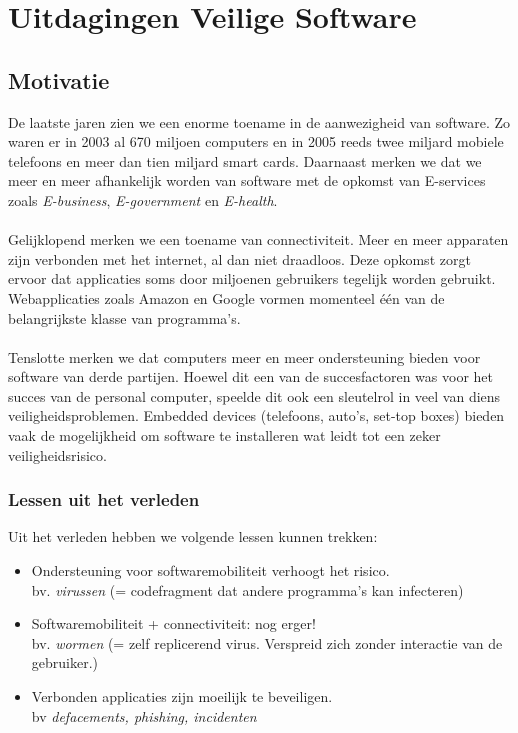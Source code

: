 \documentclass[../main.tex]{subfiles}
\begin{document}
\chapter{Uitdagingen Veilige Software}

\section{Motivatie}
De laatste jaren zien we een enorme toename in de aanwezigheid van software. Zo waren er in 2003 al 670 miljoen computers en in 2005 reeds twee miljard mobiele telefoons en meer dan tien miljard smart cards. Daarnaast merken we dat we meer en meer afhankelijk worden van software met de opkomst van E-services zoals \textit{E-business}, \textit{E-government} en \textit{E-health}. 
\\\\
Gelijklopend merken we een toename van connectiviteit. Meer en meer apparaten zijn verbonden met het internet, al dan niet draadloos. Deze opkomst zorgt ervoor dat applicaties soms door miljoenen gebruikers tegelijk worden gebruikt. Webapplicaties zoals Amazon en Google vormen momenteel \'e\'en van de belangrijkste klasse van programma's.
\\\\
Tenslotte merken we dat computers meer en meer ondersteuning bieden voor software van derde partijen. Hoewel dit een van de succesfactoren was voor het succes van de personal computer, speelde dit ook een sleutelrol in veel van diens veiligheidsproblemen. Embedded devices (telefoons, auto's, set-top boxes) bieden vaak de mogelijkheid om software te installeren wat leidt tot een zeker veiligheidsrisico.

\subsection{Lessen uit het verleden}
Uit het verleden hebben we volgende lessen kunnen trekken:
\begin{itemize}
	\item Ondersteuning voor softwaremobiliteit verhoogt het risico. \\ bv. \textit{virussen} (= codefragment dat andere programma's kan infecteren)
	\item Softwaremobiliteit + connectiviteit: nog erger! \\ bv. \textit{wormen} (= zelf replicerend virus. Verspreid zich zonder interactie van de gebruiker.)
	\item Verbonden applicaties zijn moeilijk te beveiligen. \\ bv \textit{defacements, phishing, incidenten}
\end{itemize}
\end{document}
